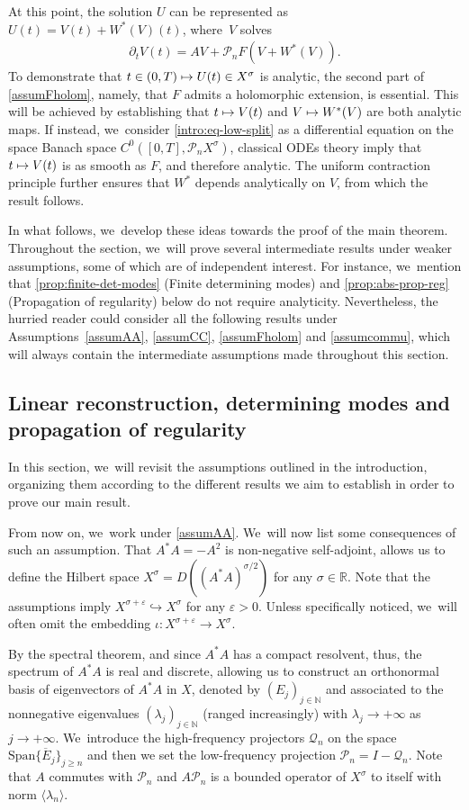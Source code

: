 \documentclass[11pt]{article}
\newcommand{\Subsection}{\subsection}
\newcommand\mto{\mathchoice{\longmapsto}{\mapsto}{\mapsto}{\mapsto}}
\theoremstyle{definition}
\let\ld\lambda
\let\veps\varepsilon
\newcommand{\R}{\mathbb{R}}
\newcommand{\N}{\mathbb{N}}
\newcommand{\Q}{\mathcal{Q}}
\renewcommand{\P}{\mathcal{P}}
\providecommand{\inn}[1]{\langle#1\rangle}
\begin{document}
At this point, the solution $U$ can be represented as $U(t)=V(t)+W^*(V)(t)$, where~$V$ solves
\begin{align}\label{intro:eq-low-split}
\partial_t V(t)=AV+\P_n F(V+W^*(V)).
\end{align}
To demonstrate that $t\in (0, T)\mto U(t)\in X^\sigma$ is analytic, the second part of \cref{assumFholom}, namely, that $F$ admits a holomorphic extension, is essential. This will be achieved by establishing that $t\mto V(t)$ and $V\mto W^*(V)$ are both analytic maps. If instead, we~consider \eqref{intro:eq-low-split} as a differential equation on the space Banach space $C^0([0, T], \P_n X^\sigma)$, classical ODEs theory imply that $t\mto V(t)$ is as smooth as $F$, and therefore analytic. The uniform contraction principle further ensures that $W^*$ depends analytically on $V$, from which the result follows.

In what follows, we~develop these ideas towards the proof of the main theorem. Throughout the section, we~will prove several intermediate results under weaker assumptions, some of which are of independent interest. For instance, we~mention that \cref{prop:finite-det-modes} (Finite determining modes) and \cref{prop:abs-prop-reg} (Propagation of regularity) below do not require analyticity. Nevertheless, the hurried reader could consider all the following results under Assumptions~\ref{assumAA}, \ref{assumCC}, \ref{assumFholom} and \ref{assumcommu}, which will always contain the intermediate assumptions made throughout this section.

\Subsection{Linear reconstruction, determining modes and propagation of regularity} In this section, we~will revisit the assumptions outlined in the introduction, organizing them according to the different results we aim to establish in order to prove our main result.

From now on, we~work under \cref{assumAA}. We~will now list some consequences of such an assumption. That $A^*A=-A^2$ is non-negative self-adjoint, allows us to define the Hilbert space $X^{\sigma}=D((A^*A)^{\sigma/2})$ for any $\sigma\in\R$. Note that the assumptions imply $X^{\sigma+\veps}\hookrightarrow X^{\sigma} $ for any $\veps>0$. Unless specifically noticed, we~will often omit the embedding $\iota: X^{\sigma+\veps}\to X^{\sigma}$.

By the spectral theorem, and since $A^*A$ has a compact resolvent, thus, the spectrum of $A^*A$ is real and discrete, allowing us to construct an orthonormal basis of eigenvectors of $A^*A$ in $X$, denoted by $(E_j)_{j\in\N}$ and associated to the nonnegative eigenvalues $(\lambda_j)_{j\in \N}$ (ranged increasingly) with $\lambda_j \to+\infty$ as $j\to +\infty$. We~introduce the high-frequency projectors $\Q_n$ on the space $\overline{\text{Span}\{E_j\}_{j\geq n}}$ and then we set the low-frequency projection $\P_n=I-\Q_n$. Note that $A$ commutes with $\P_n$ and $A\P_n$ is a bounded operator of $X^{\sigma}$ to itself with norm $\inn{\ld_n}$.
\end{document}
